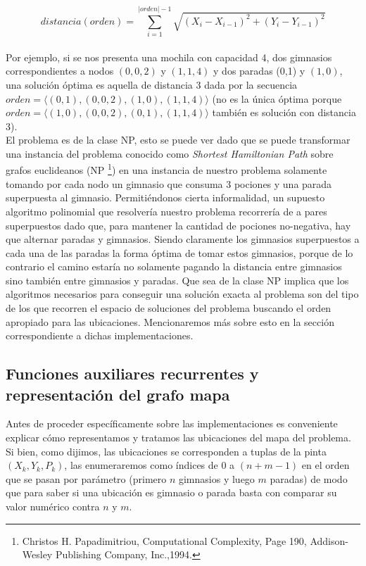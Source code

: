   $$ distancia(orden) = \sum_{i=1}^{|orden|-1} \sqrt{(X_i - X_{i-1})^2 + (Y_i - Y_{i-1})^2} $$
   \\

   Por ejemplo, si se nos presenta una mochila con capacidad 4, dos gimnasios correspondientes a nodos $(0,0,2)$ y $(1,1,4)$ y dos paradas (0,1) y $(1,0)$, una solución óptima es aquella de distancia 3 dada por la secuencia $orden =\langle {(0,1), (0,0,2), (1,0), (1,1,4)} \rangle$ (no es la única óptima porque $orden = \langle {(1,0), (0,0,2), (0,1), (1,1,4)} \rangle$ también es solución con distancia 3).
   \\

   El problema es de la clase NP, esto se puede ver dado que se puede transformar una instancia del problema conocido como \emph{Shortest Hamiltonian Path} sobre grafos euclideanos (NP \footnote{Christos H. Papadimitriou, Computational Complexity, Page 190, Addison-Wesley Publishing Company, Inc.,1994.}) en una instancia de nuestro problema solamente tomando por cada nodo un gimnasio que consuma 3 pociones y una parada superpuesta al gimnasio. Permitiéndonos cierta informalidad, un supuesto algoritmo polinomial que resolvería nuestro problema recorrería de a pares superpuestos dado que, para mantener la cantidad de pociones no-negativa, hay que alternar paradas y gimnasios. Siendo claramente los gimnasios superpuestos a cada una de las paradas la forma óptima de tomar estos gimnasios, porque de lo contrario el camino estaría no solamente pagando la distancia entre gimnasios sino también entre gimnasios y paradas. Que sea de la clase NP implica que los algoritmos necesarios para conseguir una solución exacta al problema son del tipo de los que recorren el espacio de soluciones del problema buscando el orden apropiado para las ubicaciones. Mencionaremos más sobre esto en la sección correspondiente a dichas implementaciones.

   \subsection{Funciones auxiliares recurrentes y representación del grafo mapa}

   Antes de proceder específicamente sobre las implementaciones es conveniente explicar cómo representamos y tratamos las ubicaciones del mapa del problema. Si bien, como dijimos, las ubicaciones se corresponden a tuplas de la pinta $(X_k, Y_k, P_k)$, las enumeraremos como índices de 0 a $(n + m - 1)$ en el orden que se pasan por parámetro (primero $n$ gimnasios y luego $m$ paradas) de modo que para saber si una ubicación es gimnasio o parada basta con comparar su valor numérico contra $n$ y $m$.
   \\

